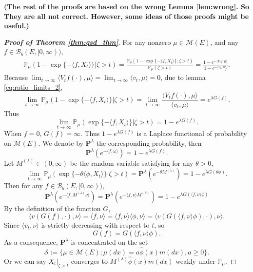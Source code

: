 \documentclass[12pt,a4paper]{amsart}
\numberwithin{equation}{section}
\theoremstyle{plain}
\theoremstyle{definition}
\begin{document}
{\bf (The rest of the proofs are based on the wrong Lemma \ref{lem:wrong}. So They are all not correct. However, some ideas of those proofs might be useful.)

\begin{proof}[{\bf Proof of Theorem \ref{thm:qsd_thm}}]
  For any nonzero $\mu\in \mathcal M(E)$, and any $f\in\mathcal B_b(E,[0,\infty))$,
  \begin{eqnarray*}
    \mathbb P_\mu\left(\left.1-\exp\{-\langle f, X_t\rangle \}\right|\zeta>t\right)= \frac{\mathbb P_\mu\left(1-\exp\{-\langle f, X_t\rangle \};\zeta>t\right)}{\mathbb P_\mu(\zeta>t)}=\frac{1-e^{-\langle V_tf,\mu\rangle }}{1-e^{-\langle v_t,\mu}\rangle }.
  \end{eqnarray*}
  Because $\lim_{t\rightarrow\infty}\langle V_tf(\cdot),\mu\rangle =\lim_{t\rightarrow\infty}\langle v_t,\mu\rangle =0$, due to lemma \ref{eq:ratio_limits_2},
  \[
    \lim_{t\rightarrow\infty}\mathbb P_\mu\left(\left.1-\exp\{-\langle f, X_t\rangle \}\right|\zeta>t\right)=\lim_{t\rightarrow\infty}\frac{\langle V_tf(\cdot),\mu\rangle }{\langle v_t,\mu\rangle }=e^{\lambda G(f)}.
  \]
  Thus
  \[
    \lim_{t\rightarrow\infty}\mathbb P_\mu\left(\left.\exp\{-\langle f, X_t\rangle \}\right|\zeta>t\right)=1-e^{\lambda G(f)}.
  \]
  When $f=0$, $G(f)=\infty$. Thus $1-e^{\lambda G(f)}$ is a Laplace functional of probability on $\mathcal M(E)$. We denote by $\mathbf P^{\lambda}$ the corresponding probability, then
  \[
    \mathbf P^{\lambda}(e^{-\langle f,\omega\rangle })=1-e^{\lambda G(f)}.
  \]
  Let $M^{(\lambda)}\in (0,\infty)$ be the random variable satisfying for any $\theta>0$,
  \[
    \lim_{t\rightarrow\infty}\mathbb P_\mu\left(\left.\exp\{-\theta\langle \phi, X_t\rangle \}\right|\zeta>t\right)
    =\mathbf P^{\lambda}(e^{-\theta M^{(\lambda)}})=1-e^{\lambda G(\theta\phi)}.
  \]
  Then for any $f\in \mathcal B_b(E,[0,\infty))$,
  \[
    \mathbf P^{\lambda}(e^{-\langle f,M^{(\lambda)}\nu\rangle })
    =\mathbf P^{\lambda}(e^{-\langle f,\nu\rangle M^{(\lambda)}})
    =1-e^{\lambda G(\langle f,\nu\rangle \phi)}
  \]
  By the definition of the function $G$,
  \[
    \langle v(G(f),\cdot),\nu\rangle =\langle f,\nu\rangle =\langle f,\nu\rangle \langle \phi,\nu\rangle =\langle v(G(\langle f,\nu\rangle \phi),\cdot),\nu\rangle .
  \]
  Since $\langle v_t,\nu\rangle $ is strictly decreasing with respect to $t$, so
  \begin{equation}\label{eq:eq_iden_G}
    G(f)=G(\langle f,\nu\rangle \phi).
  \end{equation}
  As a consequence, $\mathbf P^\lambda$ is concentrated on the set
  $$
  \mathcal S:=\{\mu\in\mathcal M(E); \mu(dx)=a\widehat\phi(x)m(dx), a\geq 0\}.
  $$
  Or we can say  $X_t|_{\zeta>t}$ converges to  $M^{(\lambda)}\widehat\phi(x)m(dx)$ weakly under $\mathbb P_\mu$.



\end{proof}}
\end{document}
